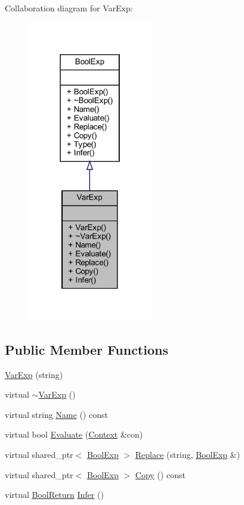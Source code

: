 Collaboration diagram for Var\+Exp\+:
\nopagebreak
\begin{figure}[H]
\begin{center}
\leavevmode
\includegraphics[width=154pt]{classVarExp__coll__graph}
\end{center}
\end{figure}
\subsection*{Public Member Functions}
\begin{DoxyCompactItemize}
\item 
\mbox{\hyperlink{classVarExp_a8281aeafbde537140bacfed1a894e889}{Var\+Exp}} (string)
\item 
virtual \mbox{\hyperlink{classVarExp_a5e1198cc9abe533d0a606e27d7b20e75}{$\sim$\+Var\+Exp}} ()
\item 
virtual string \mbox{\hyperlink{classVarExp_af50f77454d193ebfd7633f5f20becaf4}{Name}} () const
\item 
virtual bool \mbox{\hyperlink{classVarExp_af9d73e76a255123e00d5ebb1ae703188}{Evaluate}} (\mbox{\hyperlink{classContext}{Context}} \&con)
\item 
virtual shared\+\_\+ptr$<$ \mbox{\hyperlink{classBoolExp}{Bool\+Exp}} $>$ \mbox{\hyperlink{classVarExp_a0b716a76069a7fad3b99b86a9bd9d331}{Replace}} (string, \mbox{\hyperlink{classBoolExp}{Bool\+Exp}} \&)
\item 
virtual shared\+\_\+ptr$<$ \mbox{\hyperlink{classBoolExp}{Bool\+Exp}} $>$ \mbox{\hyperlink{classVarExp_ad93ffa6aa927bc41c9765bc37b4d0a63}{Copy}} () const
\item 
virtual \mbox{\hyperlink{structBoolReturn}{Bool\+Return}} \mbox{\hyperlink{classVarExp_a6c3e1736ade0456d23085923bc3fef61}{Infer}} ()
\end{DoxyCompactItemize}


